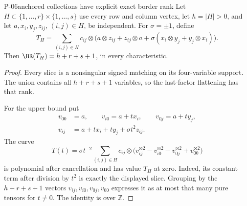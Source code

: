 \begin{finding}{P-06}{anchored collections have explicit exact border rank}
Let \(H\subset\{1,\ldots,r\}\times\{1,\ldots,s\}\) use every
row and column vertex, let \(h=|H|>0\), and let
\(a,x_i,y_j,z_{ij}\), \((i,j)\in H\), be independent.
For \(\sigma=\pm1\), define
\[
 T_H=\sum_{(i,j)\in H}c_{ij}\otimes
 \bigl(a\otimes z_{ij}+z_{ij}\otimes a
       +\sigma(x_i\otimes y_j+y_j\otimes x_i)\bigr).
\]
Then \(\BR(T_H)=h+r+s+1\), in every characteristic.
\end{finding}
\begin{proof}
Every slice is a nonsingular signed matching on its
four-variable support. The union contains all
\(h+r+s+1\) variables, so the last-factor flattening has
that rank.

For the upper bound put
\[
 \begin{split}
 v_{00}&=a,\qquad v_{i0}=a+t x_i,\qquad v_{0j}=a+t y_j,\\
 v_{ij}&=a+t x_i+t y_j+\sigma t^2z_{ij}.
 \end{split}
\]
The curve
\[
 T(t)=\sigma t^{-2}\sum_{(i,j)\in H}c_{ij}\otimes
 \bigl(v_{ij}^{\otimes2}-v_{i0}^{\otimes2}
       -v_{0j}^{\otimes2}+v_{00}^{\otimes2}\bigr)
\]
is polynomial after cancellation and has value \(T_H\) at
zero. Indeed, its constant term after division by \(t^2\)
is exactly the displayed slice. Grouping by the \(h+r+s+1\)
vectors \(v_{ij},v_{i0},v_{0j},v_{00}\) expresses it as at
most that many pure tensors for \(t\ne0\).
The identity is over \(\mathbb Z\).
\end{proof}

